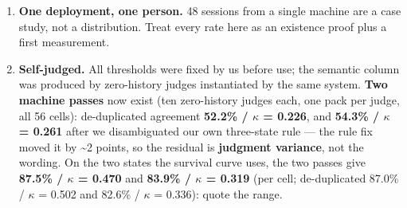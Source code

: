 \documentclass[
]{article}
\providecommand{\tightlist}{%
  \setlength{\itemsep}{0pt}\setlength{\parskip}{0pt}}
\begin{document}
\begin{enumerate}
\def\labelenumi{\arabic{enumi}.}
\tightlist
\item
  \textbf{One deployment, one person.} 48 sessions from a single machine
  are a case study, not a distribution. Treat every rate here as an
  existence proof plus a first measurement.
\item
  \textbf{Self-judged.} All thresholds were fixed by us before use; the
  semantic column was produced by zero-history judges instantiated by
  the same system. \textbf{Two machine passes} now exist (ten
  zero-history judges each, one pack per judge, all 56 cells):
  de-duplicated agreement \textbf{52.2\% / \ensuremath{\kappa} = 0.226},
  and \textbf{54.3\% / \ensuremath{\kappa} = 0.261} after we
  disambiguated our own three-state rule --- the rule fix moved it by
  \textasciitilde2 points, so the residual is \textbf{judgment
  variance}, not the wording. On the two states the survival curve uses,
  the two passes give \textbf{87.5\% / \ensuremath{\kappa} = 0.470} and
  \textbf{83.9\% / \ensuremath{\kappa} = 0.319} (per cell; de-duplicated
  87.0\% / \ensuremath{\kappa} = 0.502 and 82.6\% / \ensuremath{\kappa}
  = 0.336): quote the range.


\end{enumerate}
\end{document}
